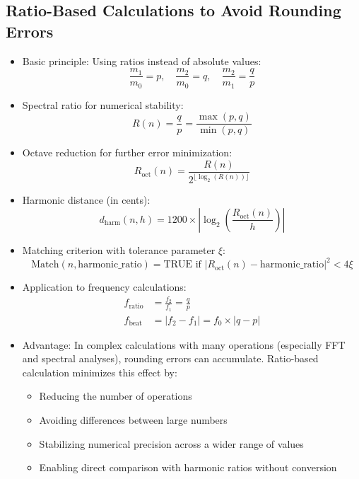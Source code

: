 \documentclass[12pt,a4paper]{article}
\begin{document}
\subsection{Ratio-Based Calculations to Avoid Rounding Errors}
\begin{itemize}
	\item Basic principle: Using ratios instead of absolute values:
	\begin{equation}
		\frac{m_1}{m_0} = p, \quad \frac{m_2}{m_0} = q, \quad \frac{m_2}{m_1} = \frac{q}{p}
	\end{equation}
	
	\item Spectral ratio for numerical stability:
	\begin{equation}
		R(n) = \frac{q}{p} = \frac{\max(p,q)}{\min(p,q)}
	\end{equation}
	
	\item Octave reduction for further error minimization:
	\begin{equation}
		R_{\text{oct}}(n) = \frac{R(n)}{2^{\lfloor\log_2(R(n))\rfloor}}
	\end{equation}
	
	\item Harmonic distance (in cents):
	\begin{equation}
		d_{\text{harm}}(n,h) = 1200 \times \left|\log_2\left(\frac{R_{\text{oct}}(n)}{h}\right)\right|
	\end{equation}
	
	\item Matching criterion with tolerance parameter $\xi$:
	\begin{equation}
		\text{Match}(n, \text{harmonic\_ratio}) = \text{TRUE if } |R_{\text{oct}}(n) - \text{harmonic\_ratio}|^2 < 4\xi
	\end{equation}
	
	\item Application to frequency calculations:
	\begin{align}
		f_{\text{ratio}} &= \frac{f_2}{f_1} = \frac{q}{p} \\
		f_{\text{beat}} &= |f_2 - f_1| = f_0 \times |q - p|
	\end{align}
	
	\item Advantage: In complex calculations with many operations (especially FFT and spectral analyses), rounding errors can accumulate. Ratio-based calculation minimizes this effect by:
	\begin{itemize}
		\item Reducing the number of operations
		\item Avoiding differences between large numbers
		\item Stabilizing numerical precision across a wider range of values
		\item Enabling direct comparison with harmonic ratios without conversion
	\end{itemize}
\end{itemize}	
	
\end{document}
